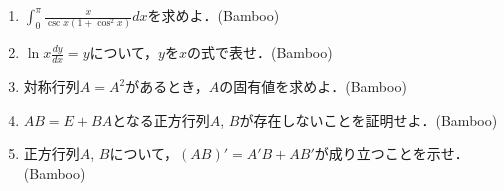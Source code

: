\documentclass{ltjsarticle}
\begin{document}
\begin{enumerate}
  \setlength{\parskip}{4cm}

  \item $\int_{0}^{\pi}\frac{x}{\csc x(1+\cos ^2 x)}dx$を求めよ．(Bamboo)
  \item $\ln x\frac{dy}{dx}=y$について，$y$を$x$の式で表せ．(Bamboo)
  \item 対称行列$A=A^2$があるとき，$A$の固有値を求めよ．(Bamboo)
  \item $AB=E+BA$となる正方行列$A$, $B$が存在しないことを証明せよ．(Bamboo)
  \item 正方行列$A$, $B$について，$(AB)'=A'B+AB'$が成り立つことを示せ．(Bamboo)

\end{enumerate}
\end{document}
